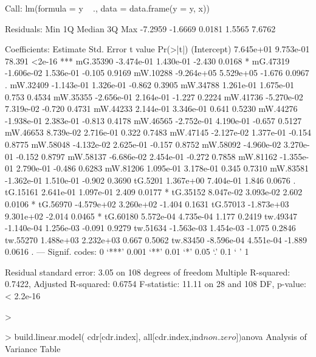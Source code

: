 Call:
lm(formula = y ~ ., data = data.frame(y = y, x))

Residuals:
    Min      1Q  Median      3Q     Max 
-7.2959 -1.6669  0.0181  1.5565  7.6762 

Coefficients:
              Estimate Std. Error t value Pr(>|t|)    
(Intercept)  7.645e+01  9.753e-01  78.391   <2e-16 ***
mG.35390    -3.474e-01  1.430e-01  -2.430   0.0168 *  
mG.47319    -1.606e-02  1.536e-01  -0.105   0.9169    
mW.10288    -9.264e+05  5.529e+05  -1.676   0.0967 .  
mW.32409    -1.143e-01  1.326e-01  -0.862   0.3905    
mW.34788     1.261e-01  1.675e-01   0.753   0.4534    
mW.35355    -2.656e-01  2.164e-01  -1.227   0.2224    
mW.41736    -5.270e-02  7.319e-02  -0.720   0.4731    
mW.44233     2.144e-01  3.346e-01   0.641   0.5230    
mW.44276    -1.938e-01  2.383e-01  -0.813   0.4178    
mW.46565    -2.752e-01  4.190e-01  -0.657   0.5127    
mW.46653     8.739e-02  2.716e-01   0.322   0.7483    
mW.47145    -2.127e-02  1.377e-01  -0.154   0.8775    
mW.58048    -4.132e-02  2.625e-01  -0.157   0.8752    
mW.58092    -4.960e-02  3.270e-01  -0.152   0.8797    
mW.58137    -6.686e-02  2.454e-01  -0.272   0.7858    
mW.81162    -1.355e-01  2.790e-01  -0.486   0.6283    
mW.81206     1.095e-01  3.178e-01   0.345   0.7310    
mW.83581    -1.362e-01  1.510e-01  -0.902   0.3690    
tG.5201      1.367e+00  7.404e-01   1.846   0.0676 .  
tG.15161     2.641e-01  1.097e-01   2.409   0.0177 *  
tG.35152     8.047e-02  3.093e-02   2.602   0.0106 *  
tG.56970    -4.579e+02  3.260e+02  -1.404   0.1631    
tG.57013    -1.873e+03  9.301e+02  -2.014   0.0465 *  
tG.60180     5.572e-04  4.735e-04   1.177   0.2419    
tw.49347    -1.140e-04  1.256e-03  -0.091   0.9279    
tw.51634    -1.563e-03  1.454e-03  -1.075   0.2846    
tw.55270     1.488e+03  2.232e+03   0.667   0.5062    
tw.83450    -8.596e-04  4.551e-04  -1.889   0.0616 .  
---
Signif. codes:  0 ‘***’ 0.001 ‘**’ 0.01 ‘*’ 0.05 ‘.’ 0.1 ‘ ’ 1

Residual standard error: 3.05 on 108 degrees of freedom
Multiple R-squared:  0.7422,	Adjusted R-squared:  0.6754 
F-statistic: 11.11 on 28 and 108 DF,  p-value: < 2.2e-16

>


> build.linear.model( cdr[cdr.index], all[cdr.index,ind$non.zero])$anova
Analysis of Variance Table

